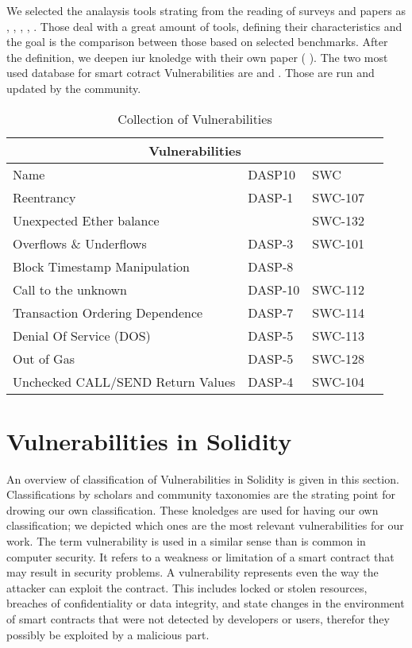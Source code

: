 \documentclass[a4paper,sigconf, language=french,
language=german, language=spanish, language=english]{acmart}
\begin{document}
We selected the analaysis tools strating from the reading of surveys and papers as \cite{SurvTools}, \cite{Thesis}, \cite{AutomaticTools}, \cite{AttacksAndProtection}, \cite{ToolsAndVuln}. 
Those deal with a great amount of tools, defining their characteristics and the goal is the comparison between those based on selected benchmarks. 
After the definition, we deepen iur knoledge with their own paper 
(\cite{Slither} \cite{Echidna} \cite{Manticore} \cite{SmartTest} \cite{Oyente}).
The two most used database for smart cotract Vulnerabilities are \cite{SWC} and \cite{DASP10}. Those are run and updated by the community. 




\begin{table*}
  \caption{Collection of Vulnerabilities}
  \begin{tabular}{ |p{5cm}||p{5cm}|p{3cm}| p{3cm} | }
  \hline
  \multicolumn{4}{|c|}{Vulnerabilities} \\
  \hline
  Name  & DASP10 & SWC \\
  \hline
  Reentrancy  & DASP-1 & SWC-107 \\
  \hline
  Unexpected Ether balance  & & SWC-132  \\
  \hline
  Overflows \& Underflows  & DASP-3 & SWC-101 \\
  \hline
  Block Timestamp Manipulation  & DASP-8 & \\
  \hline
  Call to the unknown  & DASP-10 & SWC-112 \\
  \hline
  Transaction Ordering Dependence  & DASP-7  & SWC-114 \\
  \hline
  Denial Of Service (DOS)  & DASP-5 &  SWC-113\\
  \hline
  Out of Gas  & DASP-5 & SWC-128 \\
  \hline
  Unchecked CALL/SEND Return Values  & DASP-4 & SWC-104\\
  \hline
  \end{tabular}
\end{table*}

\section{Vulnerabilities in Solidity}
\label{Vulnerabilities}
An overview of classification of Vulnerabilities in Solidity is given in this section. 
Classifications by scholars and community taxonomies are the strating point for drowing our own classification. 
These knoledges are used for having our own classification; we depicted which ones are the most relevant 
vulnerabilities for our work.
The term vulnerability is used in a similar sense than is common in computer security. 
It refers to a weakness or limitation of a smart contract that may result in
security problems. 
A vulnerability represents even the way the attacker can exploit the contract. 
This includes locked or stolen resources, breaches of confidentiality or data integrity, and state
changes in the environment of smart contracts that were not
detected by developers or users, therefor they possibly be exploited by a malicious part.
\end{document}
